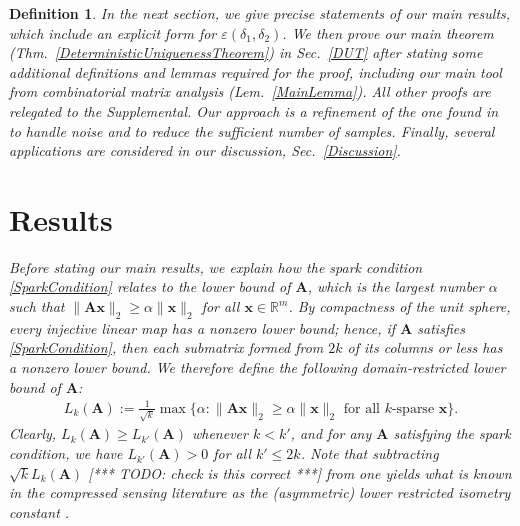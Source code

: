 \documentclass[9pt,twocolumn]{pnas-new}
\newtheorem{definition}{Definition}
\begin{document}
\begin{definition}
In the next section, we give precise statements of our main results, which include an explicit form for $\varepsilon(\delta_1, \delta_2)$. We then prove our main theorem (Thm.~\ref{DeterministicUniquenessTheorem}) in Sec.~\ref{DUT} after stating some additional definitions and lemmas required for the proof, including our main tool from combinatorial matrix analysis (Lem.~\ref{MainLemma}). All other proofs are relegated to the Supplemental. Our approach is a refinement of the one found in \cite{Hillar15} to handle noise and to reduce the sufficient number of samples.
Finally, several applications are considered in our discussion, Sec.~\ref{Discussion}.

\section{Results}

Before stating our main results, we explain how the spark condition \eqref{SparkCondition} relates to the \emph{lower bound} \cite{Grcar10} of $\mathbf{A}$, which is the largest number $\alpha$ such that \mbox{$\|\mathbf{A}\mathbf{x}\|_2 \geq \alpha\|\mathbf{x}\|_2$} for all $\mathbf{x} \in \mathbb{R}^m$. By compactness of the unit sphere, every injective linear map has a nonzero lower bound; hence, if $\mathbf{A}$ satisfies \eqref{SparkCondition}, then each submatrix formed from $2k$ of its columns or less has a nonzero lower bound. We therefore define the following domain-restricted lower bound of $\mathbf{A}$:
\begin{align*}
L_k(\mathbf{A}) := \frac{1}{\sqrt{k}}\max \{ \alpha : \|\mathbf{A}\mathbf{x}\|_2 \geq \alpha\|\mathbf{x}\|_2 \text{ for all $k$-sparse } \mathbf{x}\}.
\end{align*} 
Clearly, $L_k(\mathbf{A}) \geq L_{k'}(\mathbf{A})$ whenever $k < k'$, and for any $\mathbf{A}$ satisfying the spark condition, we have $L_{k'}(\mathbf{A}) > 0$ for all $k' \leq 2k$. Note that subtracting $\sqrt{k} L_k(\mathbf{A})$ [*** TODO: check is this correct ***] from one yields what is known in the compressed sensing literature as the (asymmetric) lower restricted isometry constant \cite{Blanchard2011, Foucart2009}. 


\end{definition}
\end{document}
